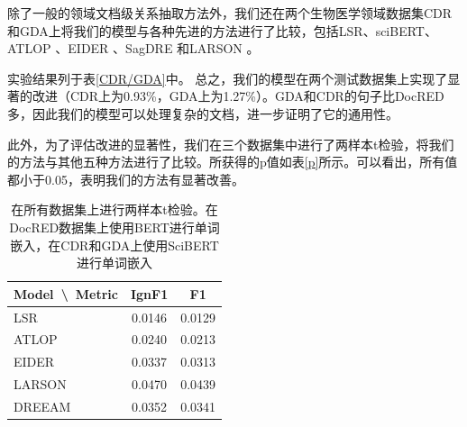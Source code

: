 \documentclass[bachelor]{thesis-uestc}
\begin{document}
除了一般的领域文档级关系抽取方法外，我们还在两个生物医学领域数据集CDR和GDA上将我们的模型与各种先进的方法进行了比较，包括LSR\cite{nan-etal-2020-reasoning}、sciBERT\cite{zhou2021document}、ATLOP \cite{zhou2021document}、EIDER \cite{xie2022eider}、SagDRE \cite{SagDRE}和LARSON \cite{duan-etal-2022-just}。\par
实验结果列于表\ref{CDR/GDA}中。
总之，我们的模型在两个测试数据集上实现了显著的改进（CDR上为0.93\%，GDA上为1.27\%）。GDA和CDR的句子比DocRED多，因此我们的模型可以处理复杂的文档，进一步证明了它的通用性。 \par
此外，为了评估改进的显著性，我们在三个数据集中进行了两样本t检验，将我们的方法与其他五种方法进行了比较。所获得的p值如表\ref{p}所示。可以看出，所有值都小于0.05，表明我们的方法有显著改善。

\begin{table}[]
    \begin{tabular}{lcc}
    \hline
    Model\ \textbackslash \ Metric       & IgnF1            & F1            \\ \hline
    LSR\cite{nan-etal-2020-reasoning}       & 0.0146           & 0.0129           \\
    ATLOP\cite{zhou2021document}  & 0.0240           & 0.0213           \\
    EIDER\cite{xie2022eider}  & 0.0337          & 0.0313          \\
    LARSON\cite{duan-etal-2022-just} & 0.0470          &   0.0439            \\ 
    DREEAM\cite{ma-etal-2023-DREEAM} &   0.0352        &   0.0341            \\ \hline
    \end{tabular}
    \caption{在所有数据集上进行两样本t检验。在DocRED数据集上使用BERT进行单词嵌入，在CDR和GDA上使用SciBERT进行单词嵌入}
    \end{table} \label{p}
\end{document}
